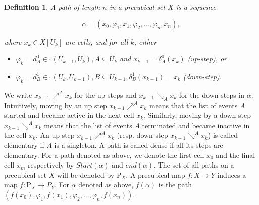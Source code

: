 \documentclass[11pt,a4paper,oldfontcommands]{memoir}
\newcommand*\ev{\textup{\textsf{ev}}}
\newtheorem{definition}{Definition}
\begin{document}
\begin{definition}
    
 A path of length $n$ in a precubical set $X$ is a sequence

$$
\alpha=\left(x_{0}, \varphi_{1}, x_{1}, \varphi_{2}, \ldots, \varphi_{n}, x_{n}\right),
$$

where $x_{k} \in X\left[U_{k}\right]$ are cells, and for all $k$, either

\begin{itemize}
  \item $\varphi_{k}=d_{A}^{0} \in \square\left(U_{k-1}, U_{k}\right), A \subseteq U_{k}$ and $x_{k-1}=\delta_{A}^{0}\left(x_{k}\right)$ (up-step), or

  \item $\varphi_{k}=d_{B}^{1} \in \square\left(U_{k}, U_{k-1}\right), B \subseteq U_{k-1}, \delta_{B}^{1}\left(x_{k-1}\right)=x_{k}$ (down-step).
\end{itemize}
\end{definition}
We write $x_{k-1} \nearrow^{A} x_{k}$ for the up-steps and $x_{k-1} \searrow_{A} x_{k}$ for the down-steps in $\alpha$. \linebreak  Intuitively, moving by an up step $x_{k-1} \nearrow^{A} x_{k}$  means that the list of events $A$ started and became active in the next cell $x_k$. Similarly, moving by a down step $x_{k-1} \searrow^{A} x_{k}$  means that the list of events $A$ terminated and became inactive in the cell $x_k$.
 An up step $x_{k-1} \nearrow^{A} x_{k}$ (resp. down step $x_{k-1} \searrow^{A} x_{k}$) is called elementary if $A$ is a singleton. A path is called dense if all its steps are elementary. For a path denoted as above, we denote the first cell $x_0$ and the final cell $x_m$ respectively by $Start(\alpha)$ and $end(\alpha)$. The set of all paths on a precubical set $X$ will be denoted by $\mathrm{P}_{X}$. 
  A precubical map $f: X \rightarrow Y $ induces a map $f:\mathrm{P}_{X} \to P_Y$. For $\alpha$ denoted as above, $f(\alpha)$ is the path $\left(f(x_{0}), \varphi_{1}, f(x_{1}), \varphi_{2}, \ldots, \varphi_{n}, f(x_{n})\right)$.%
\end{document}
